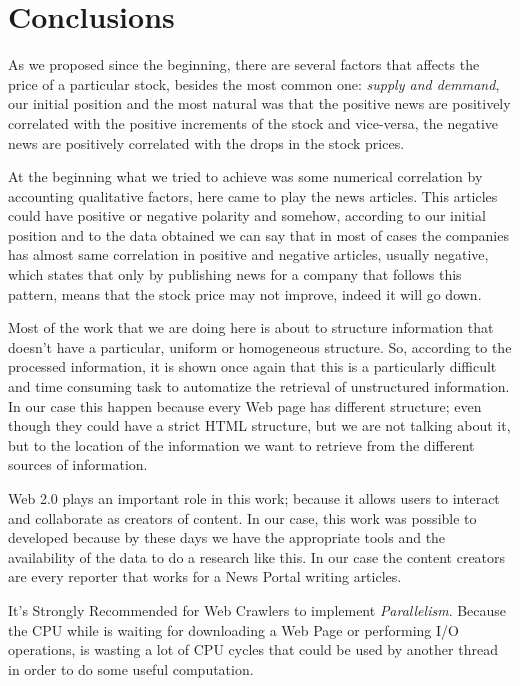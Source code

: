 \section{Conclusions}

As we proposed since the beginning, there are several factors that affects the price of a particular stock, besides the most common one: \emph{supply and demmand}, our initial position and the most natural was that the positive news are positively correlated with the positive increments of the stock and vice-versa, the negative news are positively correlated with the drops in the stock prices. 

At the beginning what we tried to achieve was some numerical correlation by accounting qualitative factors, here came to play the news articles. This articles could have positive or negative polarity and somehow, according to our initial position and to the data obtained we can say that in most of cases the companies has almost same correlation in positive and negative articles, usually negative, which states that only by publishing news for a company that follows this pattern, means that the stock price may not improve, indeed it will go down.

Most of the work that we are doing here is about to structure information that doesn't have a particular, uniform or homogeneous structure. So, according to the processed information, it is shown once again that this is a particularly difficult and time consuming task to automatize the retrieval of unstructured information. In our case this happen because every Web page has different structure; even though they could have a strict HTML structure, but we are not talking about it, but to the location of the information we want to retrieve from  the different sources of information.

Web 2.0 plays an important role in this work; because it allows users to interact and collaborate as creators of content. In our case, this work was possible to developed because by these days we have the appropriate tools and the availability of the data to do a research like this. In our case the content creators are every reporter that works for a News Portal writing articles.

It's Strongly Recommended for Web Crawlers to implement \emph{Parallelism}. Because the CPU while is waiting for downloading a Web Page or performing I/O operations, is wasting a lot of CPU cycles that could be used by another thread in order to do some useful computation.

